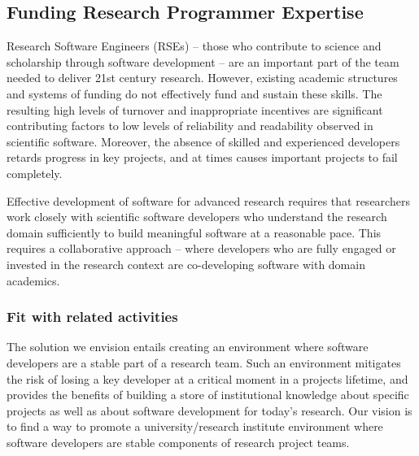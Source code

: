 \subsection{Funding Research Programmer Expertise}
\label{RSE}



Research Software Engineers (RSEs) -- those who contribute to science and
scholarship through software development -- are an important part of the team
needed to deliver 21st century research. However, existing academic structures
and systems of funding do not effectively fund and sustain these skills. The
resulting high levels of turnover and inappropriate incentives are significant
contributing factors to low levels of reliability and readability observed in
scientific software. Moreover, the absence of skilled and experienced developers
retards progress in key projects, and at times causes important projects to fail
completely.

Effective development of software for advanced research requires that
researchers work closely with scientific software developers who understand the
research domain sufficiently to build meaningful software at a reasonable pace.
This requires a collaborative approach -- where developers who are fully engaged
or invested in the research context are co-developing software with domain
academics.

\subsubsection{Fit with related activities}

The solution we envision entails creating an environment where software
developers are a stable part of a research team. Such an environment mitigates
the risk of losing a key developer at a critical moment in a projects lifetime,
and provides the benefits of building a store of institutional knowledge about
specific projects as well as about software development for today's research.
Our vision is to find a way to promote a university/research institute
environment where software developers are stable components of research project
teams.

